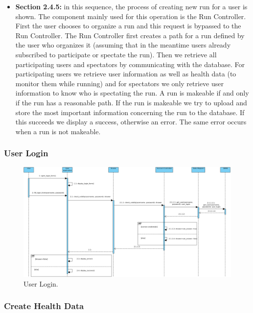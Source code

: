 \documentclass[12pt]{article}
\begin{document}
\begin{itemize}
    
    \item \textbf{Section 2.4.5:} in this sequence, the process of creating new run for a user is shown. The component mainly used for this operation is the Run Controller. First the user chooses to organize a run and this request is bypassed to the Run Controller. The Run Controller first creates a path for a run defined by the user who organizes it (assuming that in the meantime users already subscribed to participate or spectate the run). Then we retrieve all participating users and spectators by communicating with the database. For participating users we retrieve user information as well as health data (to monitor them while running) and for spectators we only retrieve user information to know who is spectating the run. A run is makeable if and only if the run has a reasonable path. If the run is makeable we try to upload and store the most important information concerning the run to the database. If this succeeds we display a success, otherwise an error. The same error occurs when a run is not makeable.
\end{itemize}

\subsubsection{User Login}

\begin{figure}[H]
    \centering
    \includegraphics[scale=0.37, angle=-90, origin=c]{loginRuntimeView.png}
    \caption{User Login.}
    \label{fig:loginRuntimeView}
\end{figure}

\subsubsection{Create Health Data}
\end{document}
